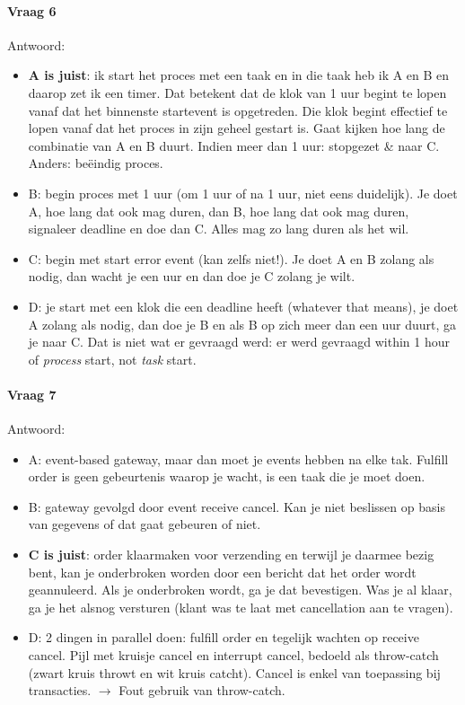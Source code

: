 \documentclass[10pt,a4paper]{report}
\begin{document}
\paragraph{Vraag 6}Antwoord:
\begin{itemize}
\item \textbf{A is juist}: ik start het proces met een taak en in die taak heb ik A en B en daarop zet ik een timer. Dat betekent dat de klok van 1 uur begint te lopen vanaf dat het binnenste startevent is opgetreden. Die klok begint effectief te lopen vanaf dat het proces in zijn geheel gestart is. Gaat kijken hoe lang de combinatie van A en B duurt. Indien meer dan 1 uur: stopgezet \& naar C. Anders: beëindig proces.
\item B: begin proces met 1 uur (om 1 uur of na 1 uur, niet eens duidelijk). Je doet A, hoe lang dat ook mag duren, dan B, hoe lang dat ook mag duren, signaleer deadline en doe dan C. Alles mag zo lang duren als het wil.
\item C: begin met start error event (kan zelfs niet!). Je doet A en B zolang als nodig, dan wacht je een uur en dan doe je C zolang je wilt.
\item D: je start met een klok die een deadline heeft (whatever that means), je doet A zolang als nodig, dan doe je B en als B op zich meer dan een uur duurt, ga je naar C. Dat is niet wat er gevraagd werd: er werd gevraagd within 1 hour of \emph{process} start, not \emph{task} start.
\end{itemize}

\paragraph{Vraag 7}Antwoord: 
\begin{itemize}
\item A: event-based gateway, maar dan moet je events hebben na elke tak. Fulfill order is geen gebeurtenis waarop je wacht, is een taak die je moet doen.
\item B: gateway gevolgd door event receive cancel. Kan je niet beslissen op basis van gegevens of dat gaat gebeuren of niet.
\item \textbf{C is juist}: order klaarmaken voor verzending en terwijl je daarmee bezig bent, kan je onderbroken worden door een bericht dat het order wordt geannuleerd. Als je onderbroken wordt, ga je dat bevestigen. Was je al klaar, ga je het alsnog versturen (klant was te laat met cancellation aan te vragen).
\item D: 2 dingen in parallel doen: fulfill order en tegelijk wachten op receive cancel. Pijl met kruisje cancel en interrupt cancel, bedoeld als throw-catch (zwart kruis throwt en wit kruis catcht). Cancel is enkel van toepassing bij transacties. $\rightarrow$ Fout gebruik van throw-catch.
\end{itemize}
\end{document}
